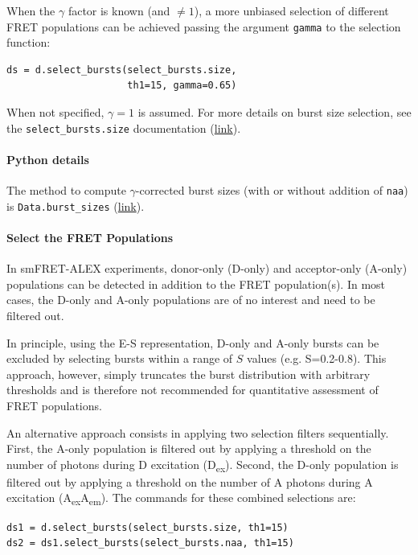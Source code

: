 \documentclass[10pt,letterpaper]{article}
\begin{document}
When the $\gamma$ factor is known (and $\ne 1$), a more unbiased selection of different FRET
populations can be achieved passing the argument \verb|gamma| to the
selection function:

\begin{lstlisting}
ds = d.select_bursts(select_bursts.size,
                     th1=15, gamma=0.65)
\end{lstlisting}

When not specified, $\gamma=1$ is assumed.
For more details on burst size selection, see the
\verb|select_bursts.size| documentation
(\href{http://fretbursts.readthedocs.org/en/latest/burst_selection.html#fretbursts.select_bursts.size}{link}).

\paragraph*{Python details}
The method to compute $\gamma$-corrected burst sizes (with 
or without addition of \verb|naa|)
is \verb|Data.burst_sizes|
(\href{http://fretbursts.readthedocs.org/en/latest/data_class.html#fretbursts.burstlib.Data.burst_sizes}{link}).

\paragraph*{Select the FRET Populations}
In smFRET-ALEX experiments, donor-only (D-only) and acceptor-only (A-only) populations can be detected in addition to the FRET population(s).
In most cases, the D-only and A-only populations are of no interest and need to be filtered out.

In principle, using the E-S representation, D-only and A-only bursts
can be excluded by selecting bursts within a range of $S$ values (e.g. S=0.2-0.8).
This approach, however, simply truncates the burst distribution with arbitrary
thresholds and is therefore not recommended for quantitative assessment of FRET
populations.

An alternative approach consists in applying two selection filters sequentially.
First, the A-only population is filtered out
by applying a threshold on the number of photons during D excitation (D\textsubscript{ex}).
Second, the D-only population is filtered out by applying a threshold on
the number of A photons during A excitation (A\textsubscript{ex}A\textsubscript{em}).
The commands for these combined selections are:

\begin{lstlisting}
ds1 = d.select_bursts(select_bursts.size, th1=15)
ds2 = ds1.select_bursts(select_bursts.naa, th1=15)
\end{lstlisting}
\end{document}
